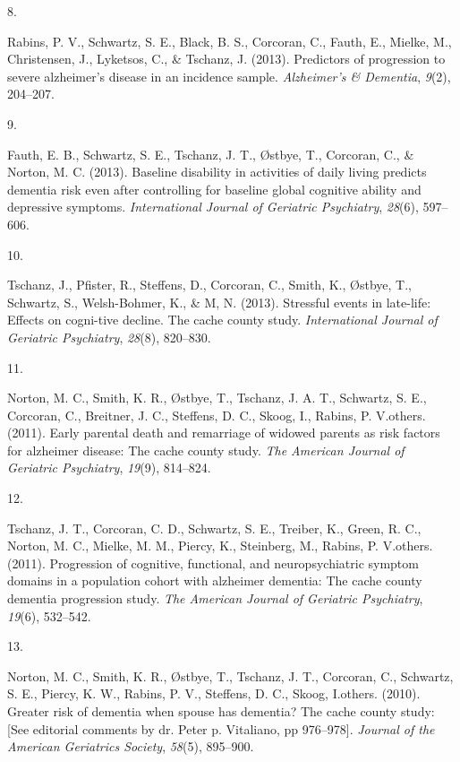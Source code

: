 \documentclass[11pt,a4paper,]{moderncv}
\newlength{\csllabelwidth}
\newcommand{\CSLLeftMargin}[1]{\parbox[t]{\csllabelwidth}{#1}}
\newcommand{\CSLRightInline}[1]{\parbox[t]{\linewidth - \csllabelwidth}{#1}}
\begin{document}
\leavevmode{}%
\CSLLeftMargin{8. }
\CSLRightInline{Rabins, P. V., Schwartz, S. E., Black, B. S., Corcoran,
C., Fauth, E., Mielke, M., Christensen, J., Lyketsos, C., \& Tschanz, J.
(2013). Predictors of progression to severe alzheimer's disease in an
incidence sample. \emph{Alzheimer's \& Dementia}, \emph{9}(2),
204--207.}

\leavevmode{}%
\CSLLeftMargin{9. }
\CSLRightInline{Fauth, E. B., Schwartz, S. E., Tschanz, J. T., Østbye,
T., Corcoran, C., \& Norton, M. C. (2013). Baseline disability in
activities of daily living predicts dementia risk even after controlling
for baseline global cognitive ability and depressive symptoms.
\emph{International Journal of Geriatric Psychiatry}, \emph{28}(6),
597--606.}

\leavevmode{}%
\CSLLeftMargin{10. }
\CSLRightInline{Tschanz, J., Pfister, R., Steffens, D., Corcoran, C.,
Smith, K., Østbye, T., Schwartz, S., Welsh-Bohmer, K., \& M, N. (2013).
Stressful events in late-life: Effects on cogni-tive decline. The cache
county study. \emph{International Journal of Geriatric Psychiatry},
\emph{28}(8), 820--830.}

\leavevmode{}%
\CSLLeftMargin{11. }
\CSLRightInline{Norton, M. C., Smith, K. R., Østbye, T., Tschanz, J. A.
T., Schwartz, S. E., Corcoran, C., Breitner, J. C., Steffens, D. C.,
Skoog, I., Rabins, P. V.others. (2011). Early parental death and
remarriage of widowed parents as risk factors for alzheimer disease: The
cache county study. \emph{The American Journal of Geriatric Psychiatry},
\emph{19}(9), 814--824.}

\leavevmode{}%
\CSLLeftMargin{12. }
\CSLRightInline{Tschanz, J. T., Corcoran, C. D., Schwartz, S. E.,
Treiber, K., Green, R. C., Norton, M. C., Mielke, M. M., Piercy, K.,
Steinberg, M., Rabins, P. V.others. (2011). Progression of cognitive,
functional, and neuropsychiatric symptom domains in a population cohort
with alzheimer dementia: The cache county dementia progression study.
\emph{The American Journal of Geriatric Psychiatry}, \emph{19}(6),
532--542.}

\leavevmode{}%
\CSLLeftMargin{13. }
\CSLRightInline{Norton, M. C., Smith, K. R., Østbye, T., Tschanz, J. T.,
Corcoran, C., Schwartz, S. E., Piercy, K. W., Rabins, P. V., Steffens,
D. C., Skoog, I.others. (2010). Greater risk of dementia when spouse has
dementia? The cache county study: {[}See editorial comments by dr. Peter
p. Vitaliano, pp 976--978{]}. \emph{Journal of the American Geriatrics
Society}, \emph{58}(5), 895--900.}
\end{document}
